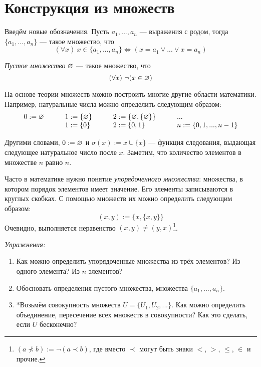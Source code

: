 \section{Конструкция из множеств}

Введём новые обозначения. Пусть $a_1,...,a_{n}$ --- выражения с родом,
тогда $\{a_{1},...,a_{n}\}$ --- такое множество, что
\[
	(\forall x)~x\in \{a_1,...,a_{n}\}\iff (x=a_1\lor...\lor x=a_{n})
\]

{\it Пустое множество} $\varnothing$ --- такое множество, что
\[
	(\forall x)~\lnot(x\in \varnothing)
\]

На основе теории множеств можно построить многие другие области математики.
Например, натуральные числа можно определить следующим образом:
\[
	\begin{array}{llll}
		0  :=\varnothing\qquad & 1  :=\{\varnothing\}\qquad & 2  :=\{\varnothing,\{\varnothing\}\}\qquad & ... \\
		                 & 1:=\{0\}\qquad       & 2:=\{0,1\}
		                 & n:=\{0,1,...,n-1\}
	\end{array}
\]

Другими словами, $0:=\varnothing$ и $\sigma(x):=x\cup \{x\}$ --- функция следования,
выдающая следующее натуральное число после $x$. Заметим, что количество элементов
в множестве $n$ равно $n$.

Часто в математике нужно понятие {\it упорядоченного множества}:
множества, в котором порядок элементов имеет значение. Его элементы записываются
в круглых скобках. С помощью множеств их можно определить следующим образом:
\[
	(x,y):=\{x,\{x,y\}\}
\]
Очевидно, выполняется неравенство $(x,y)\neq (y,x)$\footnote{
	$(a\nprec b):=\lnot(a\prec b)$, где вместо $\prec$ могут быть знаки
	$<$, $>$, $\leq$, $\in$ и прочие.
}.

{\it Упражнения:}
\begin{enumerate}
	\item{}Как можно определить упорядоченные множества из трёх элементов?
	Из одного элемента? Из $n$ элементов?

	\item{}Обосновать определения пустого множества, множества $\{a_1,...,a_{n}\}$.

	\item{}*Возьмём совокупность множеств $U=\{U_{1},U_{2},...\}$.
	Как можно определить объединение, пересечение всех множеств в совокупности?
	Как это сделать, если $U$ бесконечно?
\end{enumerate}

\pagebreak

